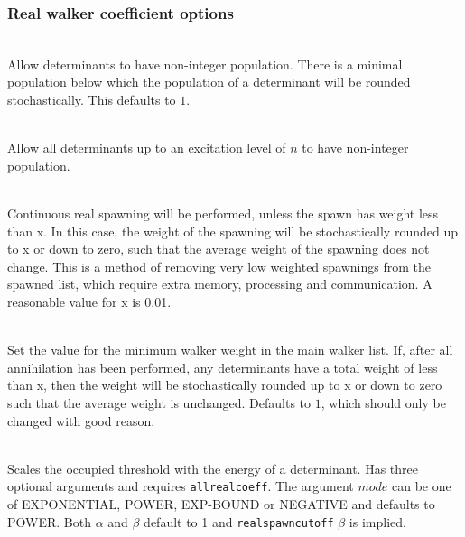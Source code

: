 \documentclass[a4paper,notitlepage]{scrreprt}
\newcommand\codeitem[1]{\needspace{1.5\baselineskip}\item[\textnormal{\ttfamily #1 \nopagebreak}] \hfill \\ \nopagebreak}
\begin{document}
  \subsubsection{Real walker coefficient options}
  \begin{description}
    \codeitem{allrealcoeff}
    Allow determinants to have non-integer population. There is a minimal
    population below which the population of a determinant will be rounded
    stochastically. This defaults to $1$.
    \codeitem{realcoeffbyexcitlevel $n$}
    Allow all determinants up to an excitation level of $n$ to have
    non-integer population.
    \codeitem{realspawncutoff $x$}
    Continuous real spawning will be performed, unless the spawn has
    weight less than x. In this case, the weight of the spawning will
    be stochastically rounded up to x or down to zero, such that the
    average weight of the spawning does not change. This is a method of
    removing very low weighted spawnings from the spawned list, which
    require extra memory, processing and communication. A reasonable
    value for x is 0.01.
    \codeitem{setoccupiedthresh $x$}
    Set the value for the minimum walker weight in the main walker
    list. If, after all annihilation has been performed, any
    determinants have a total weight of less than x, then the weight
    will be stochastically rounded up to x or down to zero such that
    the average weight is unchanged. Defaults to $1$, which should only be
    changed with good reason.
    \codeitem{energy-scaled-walker $mode$ $\alpha$ $\beta$}
    Scales the occupied threshold with the energy of a
    determinant. Has three optional arguments and requires
    \texttt{allrealcoeff}. The argument $mode$ can be one of EXPONENTIAL,
    POWER, EXP-BOUND or NEGATIVE and defaults to POWER. Both $\alpha$ and
    $\beta$ default to 1 and \texttt{realspawncutoff} $\beta$ is implied.
  \end{description}  
\end{document}
